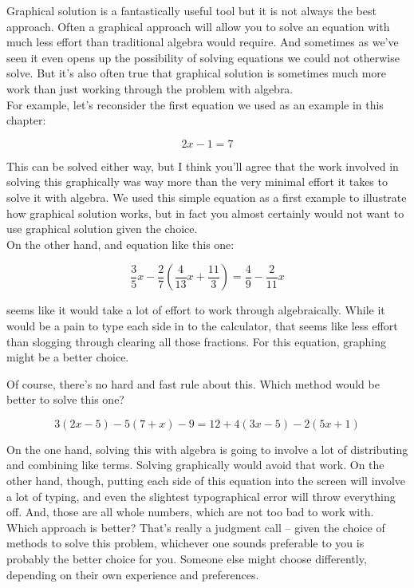 Graphical solution is a fantastically useful tool but it is not always the best approach. Often a graphical approach will allow you to solve an equation with much less effort than traditional algebra would require. And sometimes as we’ve seen it even opens up the possibility of solving equations we could not otherwise solve. But it’s also often true that graphical solution is sometimes much more work than just working through the problem with algebra.\\

For example, let’s reconsider the first equation we used as an example in this chapter:

\begin{equation*}
	2x-1=7
\end{equation*}

This can be solved either way, but I think you’ll agree that the work involved in solving this graphically was way more than the very minimal effort it takes to solve it with algebra. We used this simple equation as a first example to illustrate how graphical solution works, but in fact you almost certainly would not want to use graphical solution given the choice.\\

On the other hand, and equation like this one:

\begin{equation*}
	\frac{3}{5}x-\frac{2}{7}\left(\frac{4}{13}x+\frac{11}{3} \right) = \frac{4}{9}-\frac{2}{11}x
\end{equation*}

seems like it would take a lot of effort to work through algebraically. While it would be a pain to type each side in to the calculator, that seems like less effort than slogging through clearing all those fractions. For this equation, graphing might be a better choice.\\
\newline

Of course, there’s no hard and fast rule about this. Which method would be better to solve this one?

\begin{equation*}
	3(2x-5)-5(7+x)-9=12+4(3x-5)-2(5x+1)
\end{equation*}

On the one hand, solving this with algebra is going to involve a lot of distributing and combining like terms. Solving graphically would avoid that work. On the other hand, though, putting each side of this equation into the  screen will involve a lot of typing, and even the slightest typographical error will throw everything off. And, those are all whole numbers, which are not too bad to work with. Which approach is better? That’s really a judgment call – given the choice of methods to solve this problem, whichever one sounds preferable to you is probably the better choice for you.  Someone else might choose differently, depending on their own experience and preferences. \\
\newline


